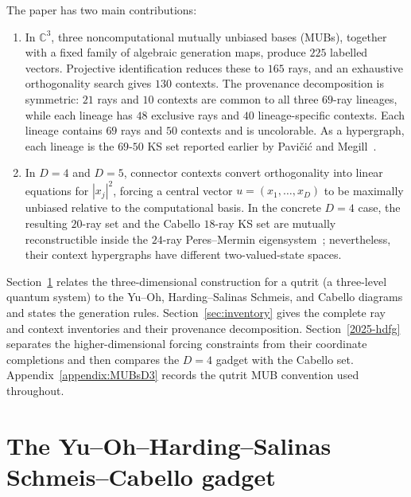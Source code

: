 \documentclass[%
  reprint,
  superscriptaddress,
  showkeys,
  amsmath,amssymb,
  aps,pra,
  longbibliography,
  floatfix,
  x11names
]{revtex4-2}
\begin{document}
The paper has two main contributions:
\begin{enumerate}
\item In $\mathbb{C}^3$, three noncomputational mutually unbiased bases (MUBs), together with a fixed family of algebraic generation maps, produce $225$ labelled vectors.  Projective identification reduces these to $165$ rays, and an exhaustive orthogonality search gives $130$ contexts.  The provenance decomposition is symmetric: $21$ rays and $10$ contexts are common to all three $69$-ray lineages, while each lineage has $48$ exclusive rays and $40$ lineage-specific contexts.  Each lineage contains $69$ rays and $50$ contexts and is uncolorable.  As a hypergraph, each lineage is the $69$-$50$ KS set reported earlier by Pavi\v{c}i\'{c} and Megill~\cite{pavicic-megill-2022,Pavicic_2023}.
\item In $D=4$ and $D=5$, connector contexts convert orthogonality into linear equations for $|x_j|^2$, forcing a central vector $u=(x_1,\ldots,x_D)$ to be maximally unbiased relative to the computational basis.  In the concrete $D=4$ case, the resulting $20$-ray set and the Cabello $18$-ray KS set are mutually reconstructible inside the $24$-ray Peres--Mermin eigensystem~\cite{peres111,mermin90b,peres-91,pavicic-2004ksafq,cabello-96}; nevertheless, their context hypergraphs have different two-valued-state spaces.
\end{enumerate}

Section~\ref{2025-yohscg} relates the
three-dimensional construction for a qutrit (a three-level quantum system)
to the Yu--Oh, Harding--Salinas Schmeis, and Cabello diagrams and states the generation rules.  Section~\ref{sec:inventory} gives the complete ray and context inventories and their provenance decomposition.  Section~\ref{2025-hdfg} separates the higher-dimensional forcing constraints from their coordinate completions and then compares the $D=4$ gadget with the Cabello set.  Appendix~\ref{appendix:MUBsD3} records the qutrit MUB convention used throughout.


\section{The Yu--Oh--Harding--Salinas Schmeis--Cabello gadget}
\label{2025-yohscg}
\end{document}
